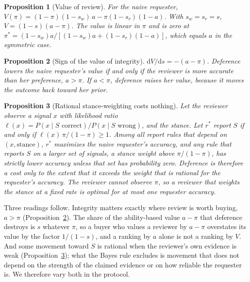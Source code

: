 \documentclass[journal]{IEEEtran}
\newtheorem{proposition}{Proposition}
\begin{document}
\setcounter{proposition}{0}
\begin{proposition}[Value of review]\label{prop:value}
For the naive requester, $V(\pi)=(1-\pi)(1-s_w)\,a-\pi(1-s_r)(1-a)$. With $s_w=s_r=s$, $V=(1-s)(a-\pi)$. The value is linear in $\pi$ and is zero at $\pi^{*}=(1-s_w)a/[(1-s_w)a+(1-s_r)(1-a)]$, which equals $a$ in the symmetric case.
\end{proposition}
\setcounter{proposition}{2}
\begin{proposition}[Sign of the value of integrity]\label{prop:sign}
$\mathrm{d}V/\mathrm{d}s=-(a-\pi)$. Deference lowers the naive requester's value if and only if the reviewer is more accurate than her preference, $a>\pi$. If $a<\pi$, deference raises her value, because it moves the outcome back toward her prior.
\end{proposition}
\setcounter{proposition}{5}
\begin{proposition}[Rational stance-weighting costs nothing]\label{prop:bayes}
Let the reviewer observe a signal $x$ with likelihood ratio $\ell(x)=P(x\mid S\text{ correct})/P(x\mid S\text{ wrong})$, and the stance. Let $r^{*}$ report $S$ if and only if $\ell(x)\,\pi/(1-\pi)\ge1$. Among all report rules that depend on $(x,\text{stance})$, $r^{*}$ maximizes the naive requester's accuracy, and any rule that reports $S$ on a larger set of signals, a stance weight above $\pi/(1-\pi)$, has strictly lower accuracy unless that set has probability zero. Deference is therefore a cost only to the extent that it exceeds the weight that is rational for the requester's accuracy. The reviewer cannot observe $\pi$, so a reviewer that weights the stance at a fixed rate is optimal for at most one requester accuracy.
\end{proposition}

Three readings follow. Integrity matters exactly where review is worth buying, $a>\pi$ (Proposition~\ref{prop:sign}). The share of the ability-based value $a-\pi$ that deference destroys is $s$ whatever $\pi$, so a buyer who values a reviewer by $a-\pi$ overstates its value by the factor $1/(1-s)$, and a ranking by $a$ alone is not a ranking by $V$. And some movement toward $S$ is rational when the reviewer's own evidence is weak (Proposition~\ref{prop:bayes}); what the Bayes rule excludes is movement that does not depend on the strength of the claimed evidence or on how reliable the requester is. We therefore vary both in the protocol.
\end{document}
